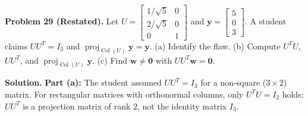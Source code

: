\documentclass[11pt, letterpaper]{article}
\theoremstyle{definition}
\theoremstyle{remark}
\begin{document}
\medskip
\textbf{Problem 29 (Restated).} Let $U = \begin{bmatrix} 1/\sqrt{5} & 0 \\ 2/\sqrt{5} & 0 \\ 0 & 1 \end{bmatrix}$ and $\mathbf{y} = \begin{bmatrix} 5 \\ 0 \\ 3 \end{bmatrix}$. A student claims $UU^T = I_3$ and $\operatorname{proj}_{\operatorname{Col}(U)} \mathbf{y} = \mathbf{y}$. (a) Identify the flaw. (b) Compute $U^T U$, $UU^T$, and $\operatorname{proj}_{\operatorname{Col}(U)} \mathbf{y}$. (c) Find $\mathbf{w} \neq \mathbf{0}$ with $UU^T\mathbf{w} = \mathbf{0}$.

\textbf{Solution.}
\textbf{Part (a):} The student assumed $UU^T = I_3$ for a non-square ($3 \times 2$) matrix. For rectangular matrices with orthonormal columns, only $U^T U = I_2$ holds; $UU^T$ is a projection matrix of rank $2$, not the identity matrix $I_3$.
\end{document}
